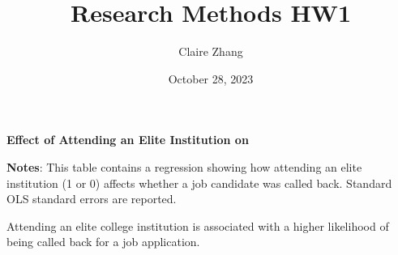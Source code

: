 \documentclass[11]{article}
\title{Research Methods HW1}
\author{Claire Zhang}
\date{October 28, 2023}
\begin{document}
\maketitle

\begin{table}[htbp]
\caption{\textbf{Effect of Attending an Elite Institution on }
\label{tab:EngApproach}}
\center
	
    \center
    \begin{footnotesize}
    \textbf{Notes}: This table contains a regression showing how attending an elite institution (1 or 0) affects whether a job candidate was called back. Standard OLS standard errors are reported.  
    \end{footnotesize}
\end{table}

Attending an elite college institution is associated with a higher likelihood of being called back for a job application.
\end{document}
